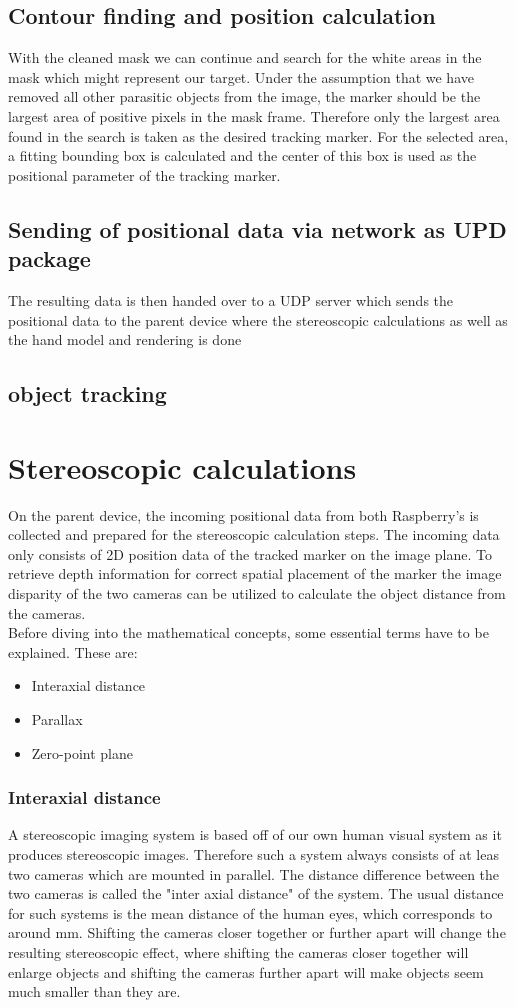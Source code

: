 \subsection{Contour finding and position calculation}
With the cleaned mask we can continue and search for the white areas in the mask which might represent our target. Under the assumption that we have removed all other parasitic objects from the image, the marker should be the largest area of positive pixels in the mask frame. Therefore only the largest area found in the search is taken as the desired tracking marker. For the selected area, a fitting bounding box is calculated and the center of this box is used as the positional parameter of the tracking marker.
\subsection{Sending of positional data via network as UPD package}
The resulting data is then handed over to a UDP server which sends the positional data to the parent device where the stereoscopic calculations as well as the hand model and rendering is done
\subsection{object tracking}
\section{Stereoscopic calculations}
On the parent device, the incoming positional data from both Raspberry's is collected and prepared for the stereoscopic calculation steps. The incoming data only consists of 2D position data of the tracked marker on the image plane. To retrieve depth information for correct spatial placement of the marker the image disparity of the two cameras can be utilized to calculate the object distance from the cameras.\cite{Tauer.2010}\\
Before diving into the mathematical concepts, some essential terms have to be explained.
These are:
\begin{itemize}
\item Interaxial distance
\item Parallax
\item Zero-point plane
\end{itemize}
\subsubsection{Interaxial distance}
A stereoscopic imaging system is based off of our own human visual system as it produces stereoscopic images. Therefore such a system always consists of at leas two cameras which are mounted in parallel. The distance difference between the two cameras is called the "inter axial distance" of the system. The usual distance for such systems is the mean distance of the human eyes, which corresponds to around  mm. Shifting the cameras closer together or further apart will change the resulting stereoscopic effect, where shifting the cameras closer together will enlarge objects and shifting the cameras further apart will make objects seem much smaller than they are. 
